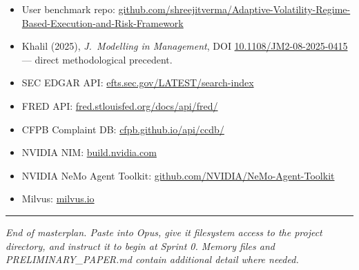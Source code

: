 \documentclass[11pt]{article}
\newcommand{\inlinecode}[1]{{\ttfamily\small #1}}
\begin{document}
\begin{itemize}
  \item User benchmark repo: \href{https://github.com/shreejitverma/Adaptive-Volatility-Regime-Based-Execution-and-Risk-Framework}{github.com/shreejitverma/Adaptive-Volatility-Regime-Based-Execution-and-Risk-Framework}
  \item Khalil (2025), \emph{J.\ Modelling in Management}, DOI \href{https://doi.org/10.1108/JM2-08-2025-0415}{10.1108/JM2-08-2025-0415} --- direct methodological precedent.
  \item SEC EDGAR API: \href{https://efts.sec.gov/LATEST/search-index}{efts.sec.gov/LATEST/search-index}
  \item FRED API: \href{https://fred.stlouisfed.org/docs/api/fred/}{fred.stlouisfed.org/docs/api/fred/}
  \item CFPB Complaint DB: \href{https://cfpb.github.io/api/ccdb/}{cfpb.github.io/api/ccdb/}
  \item NVIDIA NIM: \href{https://build.nvidia.com}{build.nvidia.com}
  \item NVIDIA NeMo Agent Toolkit: \href{https://github.com/NVIDIA/NeMo-Agent-Toolkit}{github.com/NVIDIA/NeMo-Agent-Toolkit}
  \item Milvus: \href{https://milvus.io}{milvus.io}
\end{itemize}

\vspace{1em}\hrule\vspace{0.5em}
\noindent\textit{End of masterplan. Paste into Opus, give it filesystem access to the project directory, and instruct it to begin at Sprint 0. Memory files and \inlinecode{PRELIMINARY\_PAPER.md} contain additional detail where needed.}
\end{document}
